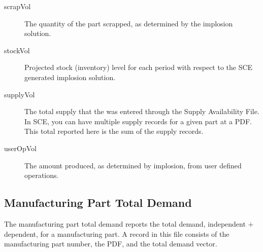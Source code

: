 \begin{description}
\item[scrapVol]
The quantity of the part scrapped, as determined by the implosion solution.

\item[stockVol] 
Projected stock (inventory) level for each period with respect
to the SCE generated implosion solution.

\item[supplyVol]  
The total supply that the was entered through the Supply Availability
File.  In SCE, you can have multiple supply records for a given part
at a PDF.  This total reported here is the sum of the supply records.
 
\item[userOpVol] 
The amount produced, as determined by implosion, from user defined
operations.

\end{description}

\subsection{Manufacturing Part Total Demand}
The manufacturing part total demand reports the total demand,
independent $+$ dependent, for a manufacturing part.  A record in this
file consists of the manufacturing part number, the PDF, and the total
demand vector.

